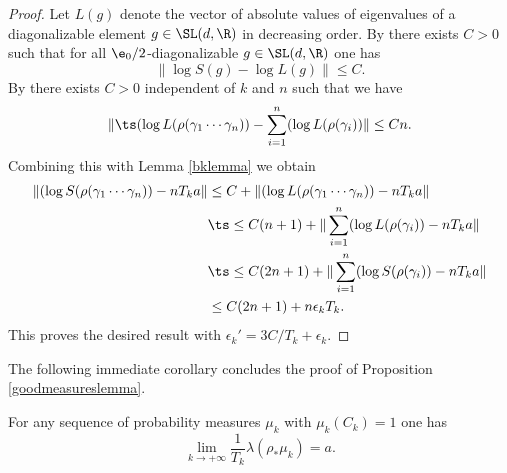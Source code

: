 \begin{proof}
Let \(L(g)\) denote the vector of absolute values of eigenvalues of a diagonalizable element \(g \in \SL(d,\R)\) in decreasing order.
By \cite[Lem.\,2.16]{2021breuillard-sert} there exists \(C > 0\) such that for all \(\e_0/2\)-diagonalizable \(g \in \SL(d,\R)\) one has
\[
\|\log S(g) - \log L(g)\| \le C.
\]
By \cite[Prop.\,2.17]{2021breuillard-sert} there exists \(C > 0\) independent of \(k\) and \(n\) such that we have
\[
\|\ts (\log L(\rho(\gamma_1\cdots \gamma_n)) - \sum_{i = 1}^n (\log L (\rho(\gamma_i))\| \le Cn.
\]
Combining this with Lemma \ref{bklemma} we obtain
\begin{align*}\|(\log S(\rho(\gamma_1 \cdots \gamma_n)) - n T_k a\| &\le C + \|(\log L (\rho(\gamma_1\cdots \gamma_n))- nT_k a\|
\\ &\ts\le C(n+1) + \|\sum_{i = 1}^n(\log L (\rho(\gamma_i)) - nT_k a\|
\\ &\ts\le C(2n+1) + \|\sum_{i = 1}^n(\log S (\rho(\gamma_i))- nT_k a\|
\\ &\le C(2n+1) + n \epsilon_k T_k.
\end{align*}
This proves the desired result with \(\epsilon_k' = 3C / T_k + \epsilon_k\).
\end{proof}

The following immediate corollary concludes the proof of Proposition \ref{goodmeasureslemma}.

\begin{corollary}
For any sequence of probability measures \(\mu_k\) with \(\mu_k(C_k) = 1\) one has
\[
\lim_{k \to +\infty}\frac{1}{T_k}\lambda(\rho_*\mu_k) = a.
\]
\end{corollary}

